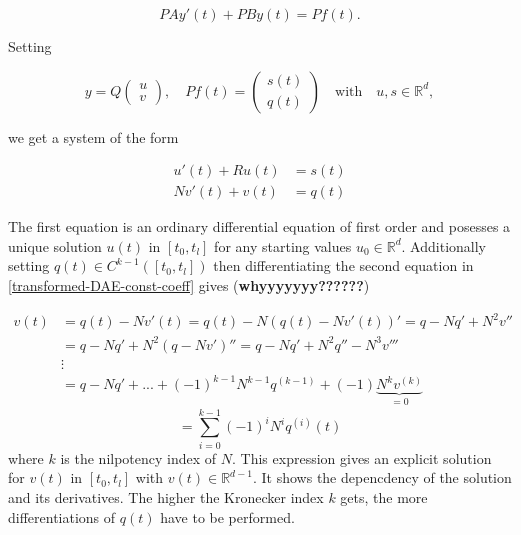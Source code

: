 \documentclass[11pt,titlepage]{article}
\begin{document}
				\begin{displaymath}
					P A y'(t) + P B y(t) = P f(t) .
				\end{displaymath}
			
				Setting
				
				\begin{displaymath}
					y = Q
					\left(
					\begin{matrix}
						u \\
						v
					\end{matrix}  
					\right) 
					, \quad
					Pf(t) = 
					\left(
					\begin{matrix}
						s(t) \\
						q(t)
					\end{matrix}
					\right)
					\quad \text{with} \quad
					u,s \in \mathbb{R}^d ,
				\end{displaymath}
				
				we get a system of the form
				
				\begin{equation}
					\label{transformed-DAE-const-coeff}
					\begin{aligned}
						u'(t) + Ru(t) &= s(t) \\
						Nv'(t) + v(t) &= q(t)
					\end{aligned}
				\end{equation}
				
				The first equation is an ordinary differential equation of first order and posesses a unique solution $u(t)$ in $[t_0,t_l]$ for any starting values $u_0 \in \mathbb{R}^d$. Additionally setting $q(t) \in C^{k-1}([t_0,t_l])$ then differentiating the second equation in \ref{transformed-DAE-const-coeff} gives (\textbf{whyyyyyyy??????})
				
				\begin{displaymath}
					\begin{aligned}
						v(t) &= q(t) - Nv'(t) = q(t) - N(q(t)-Nv'(t))' = q-Nq'+N^2v'' \\
						&= q-Nq'+N^2(q-Nv')'' = q-Nq'+N^2q''-N^3v''' \\
						&\vdots \\
						&= q-Nq'+...+(-1)^{k-1}N^{k-1}q^{(k-1)}+(-1) \underbrace{N^kv^{(k)}}_{=0}
					\end{aligned}
				\end{displaymath}
				\begin{equation}
					\label{solution-to-transformed-DAE-const-coeff-part2}
					= \sum_{i=0}^{k-1} (-1)^iN^iq^{(i)}(t) 
				\end{equation}
				where $k$ is the nilpotency index of $N$. This expression gives an explicit solution for $v(t)$ in $[t_0,t_l]$ with $v(t) \in \mathbb{R}^{d-1}$. It shows the depencdency of the solution and its derivatives. The higher the Kronecker index $k$ gets, the more differentiations of $q(t)$ have to be performed.
\end{document}
